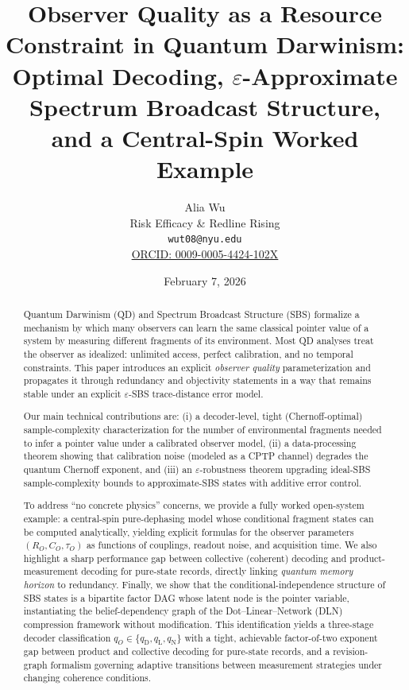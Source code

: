 \documentclass[11pt]{article}
\title{\bf Observer Quality as a Resource Constraint in Quantum Darwinism:\\
Optimal Decoding, $\varepsilon$-Approximate Spectrum Broadcast Structure,\\
and a Central-Spin Worked Example}
\author{
Alia Wu\\
Risk Efficacy \& Redline Rising\\
\texttt{wut08@nyu.edu}\\
\href{https://orcid.org/0009-0005-4424-102X}{ORCID: 0009-0005-4424-102X}
}
\date{February 7, 2026}
\newcommand{\1}{\mathbf{1}}
\theoremstyle{definition}
\theoremstyle{plain}
\begin{document}
\maketitle

\begin{abstract}
Quantum Darwinism (QD) and Spectrum Broadcast Structure (SBS) formalize a mechanism by which many observers can learn the same classical pointer value of a system by measuring different fragments of its environment.
Most QD analyses treat the observer as idealized: unlimited access, perfect calibration, and no temporal constraints.
This paper introduces an explicit \emph{observer quality} parameterization and propagates it through redundancy and objectivity statements in a way that remains stable under an explicit $\varepsilon$-SBS trace-distance error model.

Our main technical contributions are:
(i) a decoder-level, tight (Chernoff-optimal) sample-complexity characterization for the number of environmental fragments needed to infer a pointer value under a calibrated observer model,
(ii) a data-processing theorem showing that calibration noise (modeled as a CPTP channel) degrades the quantum Chernoff exponent, and
(iii) an $\varepsilon$-robustness theorem upgrading ideal-SBS sample-complexity bounds to approximate-SBS states with additive error control.

To address ``no concrete physics'' concerns, we provide a fully worked open-system example: a central-spin pure-dephasing model whose conditional fragment states can be computed analytically, yielding explicit formulas for the observer parameters $(R_O,C_O,\tau_O)$ as functions of couplings, readout noise, and acquisition time.
We also highlight a sharp performance gap between collective (coherent) decoding and product-measurement decoding for pure-state records, directly linking \emph{quantum memory horizon} to redundancy.
Finally, we show that the conditional-independence structure of SBS states is a bipartite factor DAG whose latent node is the pointer variable, instantiating the belief-dependency graph of the Dot--Linear--Network (DLN) compression framework without modification.  This identification yields a three-stage decoder classification $q_O\in\{q_{\mathrm{D}},q_{\mathrm{L}},q_{\mathrm{N}}\}$ with a tight, achievable factor-of-two exponent gap between product and collective decoding for pure-state records, and a revision-graph formalism governing adaptive transitions between measurement strategies under changing coherence conditions.
\end{abstract}
\end{document}

